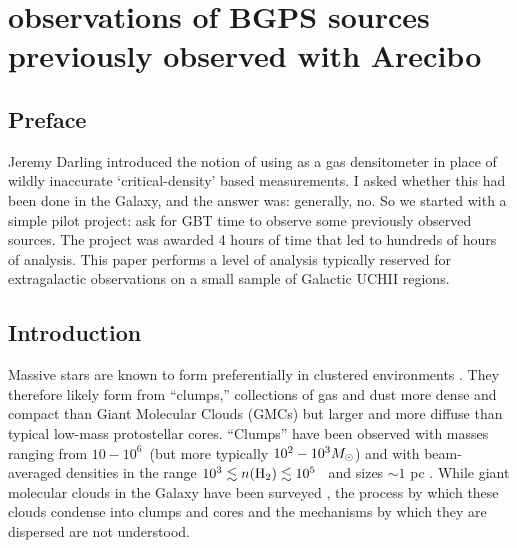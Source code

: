 
%
%

\chapter{\formaldehyde observations of BGPS sources previously observed with Arecibo}
\section{Preface}
Jeremy Darling introduced the notion of using \formaldehyde as a gas
densitometer in place of wildly inaccurate `critical-density' based
measurements.  I asked whether this had been done in the Galaxy, and the
answer was: generally, no.  So we started with a simple pilot project:
ask for GBT time to observe some previously observed \formaldehyde sources.
The project was awarded 4 hours of time that led to hundreds of hours of analysis.
This paper performs a level of analysis typically reserved for extragalactic
observations on a small sample of Galactic UCHII regions.

\section{Introduction}


Massive stars are known to form preferentially in clustered environments
\citep{DeWit2005}.  They therefore likely form from ``clumps,'' collections of
gas and dust more dense and compact than Giant Molecular Clouds (GMCs) but larger and
more diffuse than typical low-mass protostellar cores.  ``Clumps'' have been
observed with masses ranging from $10-10^6$\msun\ (but more typically
$10^2-10^3M_{\odot}$) and with beam-averaged densities in the range $10^3 \lesssim n(\textrm{H}_{2}) \lesssim
10^5$ \percc\ and sizes $\sim1$ pc \citep[e.g., ][]{Rosolowsky2010,Dunham2010}.
While giant molecular clouds  in the Galaxy have been surveyed
\citep[e.g., ][]{Jackson2006}, the process by which these clouds condense into
clumps and cores and the mechanisms by which they are dispersed are not
understood. 

